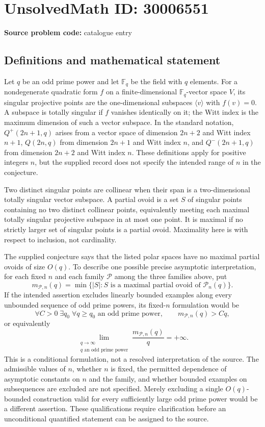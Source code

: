 \documentclass[11pt]{article}
\newcommand{\F}{\mathbb{F}}
\begin{document}
\section*{UnsolvedMath ID: 30006551}
\textbf{Source problem code:} catalogue entry
\subsection{Definitions and mathematical statement}
Let \(q\) be an odd prime power and let \(\F_q\) be the field with \(q\) elements. For a nondegenerate quadratic form \(f\) on a finite-dimensional \(\F_q\)-vector space \(V\), its singular projective points are the one-dimensional subspaces \(\langle v\rangle\) with \(f(v)=0\). A subspace is totally singular if \(f\) vanishes identically on it; the Witt index is the maximum dimension of such a vector subspace. In the standard notation, \(Q^+(2n+1,q)\) arises from a vector space of dimension \(2n+2\) and Witt index \(n+1\), \(Q(2n,q)\) from dimension \(2n+1\) and Witt index \(n\), and \(Q^-(2n+1,q)\) from dimension \(2n+2\) and Witt index \(n\). These definitions apply for positive integers \(n\), but the supplied record does not specify the intended range of \(n\) in the conjecture.

Two distinct singular points are collinear when their span is a two-dimensional totally singular vector subspace. A partial ovoid is a set \(S\) of singular points containing no two distinct collinear points, equivalently meeting each maximal totally singular projective subspace in at most one point. It is maximal if no strictly larger set of singular points is a partial ovoid. Maximality here is with respect to inclusion, not cardinality.

The supplied conjecture says that the listed polar spaces have no maximal partial ovoids of size \(O(q)\). To describe one possible precise asymptotic interpretation, for each fixed \(n\) and each family \(\mathcal P\) among the three families above, put
\[
 m_{\mathcal P,n}(q)=\min\{\lvert S\rvert:S\text{ is a maximal partial ovoid of }\mathcal P_n(q)\}.
\]
If the intended assertion excludes linearly bounded examples along every unbounded sequence of odd prime powers, its fixed-\(n\) formulation would be
\[
 \forall C>0\;\exists q_0\;\forall q\ge q_0\text{ an odd prime power},\qquad m_{\mathcal P,n}(q)>Cq,
\]
or equivalently
\[
 \lim_{\substack{q\to\infty\\q\text{ an odd prime power}}}\frac{m_{\mathcal P,n}(q)}{q}=+\infty.
\]
This is a conditional formulation, not a resolved interpretation of the source. The admissible values of \(n\), whether \(n\) is fixed, the permitted dependence of asymptotic constants on \(n\) and the family, and whether bounded examples on subsequences are excluded are not specified. Merely excluding a single \(O(q)\)-bounded construction valid for every sufficiently large odd prime power would be a different assertion. These qualifications require clarification before an unconditional quantified statement can be assigned to the source.
\end{document}
